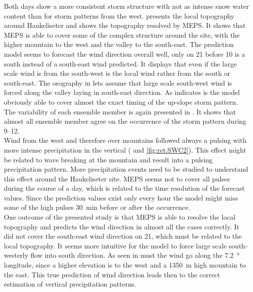\noindent
Both days show a more consistent storm structure with not as intense snow water content than for storm patterns from the west. 
 presents the local topography around Haukeliseter and  shows the topography resolved by MEPS. It shows that MEPS is able to cover some of the complex structure around the site, with the higher mountain to the west and the valley to the south-east. The prediction model seems to forecast the wind direction overall well, only on \SI{21}{\dec} before \SI{10}{\UTC} is a south instead of a south-east wind predicted. It displays that even if the large scale wind is from the south-west is the local wind rather from the south or south-east. The orography in  lets assume that large scale south-west wind is forced along the valley laying in south-east direction. As  indicates is the model obviously able to cover almost the exact timing of the up-slope storm pattern. The variability of each ensemble member is again presented in . It shows that almost all ensemble member agree on the occurrence of the storm pattern during \SIrange{9}{12}{\UTC}.
\\
Wind from the west and therefore over mountains followed always a pulsing with more intense precipitation in the vertical ( and \ref{fig:ret:SWC2}). This effect might be related to wave breaking at the mountain and result into a pulsing precipitation pattern. More precipitation events need to be studied to understand this effect around the Haukeliseter site. MEPS seems not to cover all pulses during the course of a day, which is related to the time resolution of the forecast values. Since the prediction values exist only every hour the model might miss some of the high pulses \SI{30}{\minute} before or after the occurrence. 
\\
One outcome of the presented study is that MEPS is able to resolve the local topography and predicts the wind direction in almost all the cases correctly. It did not cover the south-east wind direction on \SI{21}{\dec}, which must be related to the local topography. It seems more intuitive for the model to force large scale south-westerly flow into south direction. As seen in  must the wind go along the \SI{7.2}{\degree} longitude, since a higher elevation is to the west and a \SI{1350}{\metre} high mountain to the east. This true prediction of wind direction leads then to the correct estimation of vertical precipitation patterns. 

